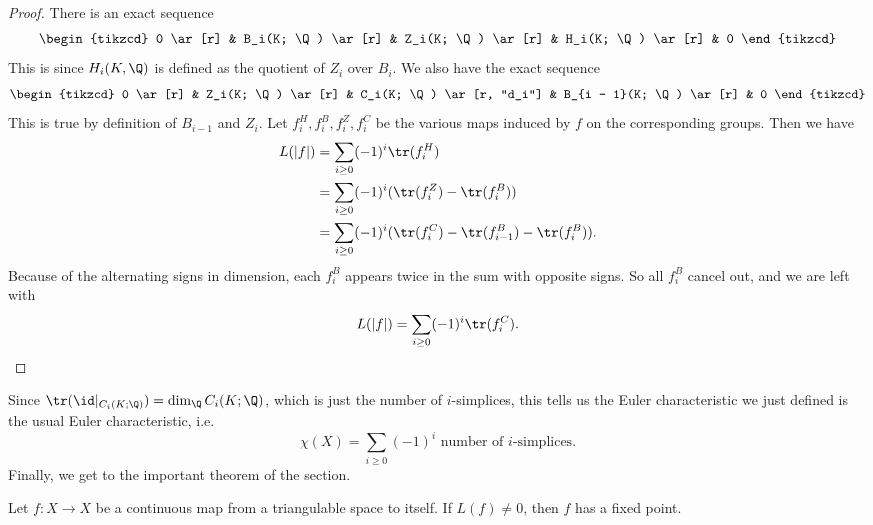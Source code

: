 \documentclass[a4paper]{article}
\begin{document}
\begin{proof}
  There is an exact sequence
  \[
    \begin{tikzcd}
      0 \ar[r] & B_i(K; \Q) \ar[r] & Z_i(K; \Q) \ar[r] & H_i(K; \Q) \ar[r] & 0
    \end{tikzcd}
  \]
  This is since $H_i(K, \Q)$ is defined as the quotient of $Z_i$ over $B_i$. We also have the exact sequence
  \[
    \begin{tikzcd}
      0 \ar[r] & Z_i(K; \Q) \ar[r] & C_i(K; \Q) \ar[r, "d_i"] & B_{i - 1}(K; \Q) \ar[r] & 0
    \end{tikzcd}
  \]
  This is true by definition of $B_{i - 1}$ and $Z_i$. Let $f_i^H, f_i^B, f_i^Z, f_i^C$ be the various maps induced by $f$ on the corresponding groups. Then we have
  \begin{align*}
    L(|f|) &= \sum_{i \geq 0} (-1)^i \tr(f_i^H)\\
    &= \sum_{i \geq 0} (-1)^i (\tr(f_i^Z) - \tr(f_i^B))\\
    &= \sum_{i \geq 0} (-1)^i (\tr(f_i^C) - \tr(f_{i - 1}^B) - \tr(f_i^B)).
  \end{align*}
  Because of the alternating signs in dimension, each $f_i^B$ appears twice in the sum with opposite signs. So all $f_i^B$ cancel out, and we are left with
  \[
    L(|f|) = \sum_{i \geq 0} (-1)^i \tr (f_i^C).\qedhere
  \]
\end{proof}

Since $\tr (\id|_{C_i(K; \Q)}) = \dim_\Q C_i(K; \Q)$, which is just the number of $i$-simplices, this tells us the Euler characteristic we just defined is the usual Euler characteristic, i.e.
\[
  \chi(X) = \sum_{i \geq 0} (-1)^i \text{ number of $i$-simplices}.
\]
Finally, we get to the important theorem of the section.
\begin{thm}
  Let $f: X \to X$ be a continuous map from a triangulable space to itself. If $L(f) \not= 0$, then $f$ has a fixed point.
\end{thm}
\end{document}
